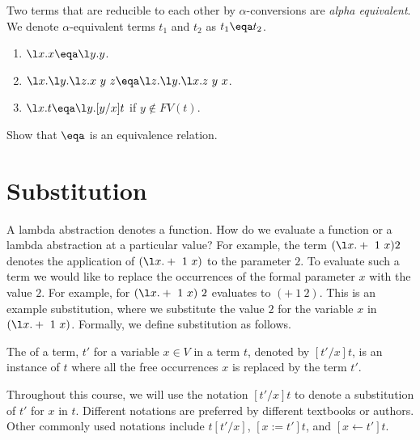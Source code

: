 \begin{definition}
Two terms that are reducible to each other by $\alpha$-conversions are
\emph{alpha equivalent}. We denote $\alpha$-equivalent terms $t_1$ and
$t_2$ as $t_1 \eqa t_2$.
\end{definition}

\begin{example}
\begin{enumerate}
\item $\l x.x \eqa \l y.y$. 
\item $\l x. \l y. \l z. x ~y~z \eqa \l z. \l y. \l x. z~y~x$.
\item $\l x.t \eqa \l y.[y/x]t$ if  $y \not\in FV(t)$.
\end{enumerate}
\end{example}

\begin{exercise}
Show that $\eqa$ is an equivalence relation.
\end{exercise}



\section{Substitution}
\label{sec:lambda::sub}

A lambda abstraction denotes a function.  How do we evaluate a
function or a lambda abstraction at a particular value?  For example,
the term $(\l x.+~1~x)2$ denotes the application of $(\l x.+~1~x)$ to
the parameter $2$.  To evaluate such a term we would like to replace
the occurrences of the formal parameter $x$ with the value $2$.  For
example, for $(\l x.+~1~x)~2$ evaluates to $(+~1~2)$.  This is an
example substitution, where we substitute the value $2$ for the
variable $x$ in $(\l x.+~1~x)$.  Formally, we define substitution as
follows.

\begin{definition}[Substitution]
\label{def:lambda::sub::basic}
The  of a term, $t'$ for a variable $x \in V$ in a term
$t$, denoted by $[t'/x]t$, is an instance of $t$ where all the free
occurrences $x$ is replaced by the term $t'$.
\end{definition}

Throughout this course, we will use the notation $[t'/x]t$ to denote a
substitution of $t'$ for $x$ in $t$.  Different notations are
preferred by different textbooks or authors. Other commonly used
notations include $t[t'/x]$, $[x:=t']t$, and  $[x \leftarrow t']t$.  

